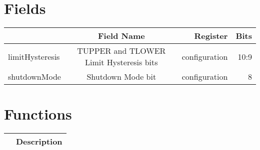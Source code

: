 \documentclass[a4paper,12pt,oneside,pdflatex,italian,final,twocolumn]{article}
\begin{document}
\raggedright

\section{Fields}

\centering
\begin{tabular}{lcrr}
\toprule
  & Field Name & Register & Bits \\
\midrule
limitHysteresis & TUPPER and TLOWER Limit Hysteresis bits & configuration &
10:9
\\

shutdownMode & Shutdown Mode bit & configuration &
8
\\

\bottomrule
\end{tabular}

\raggedright

\section{Functions}

\centering
\begin{tabular}{lc}
\toprule
  & Description \\
\midrule
\bottomrule
\end{tabular}
\end{document}

